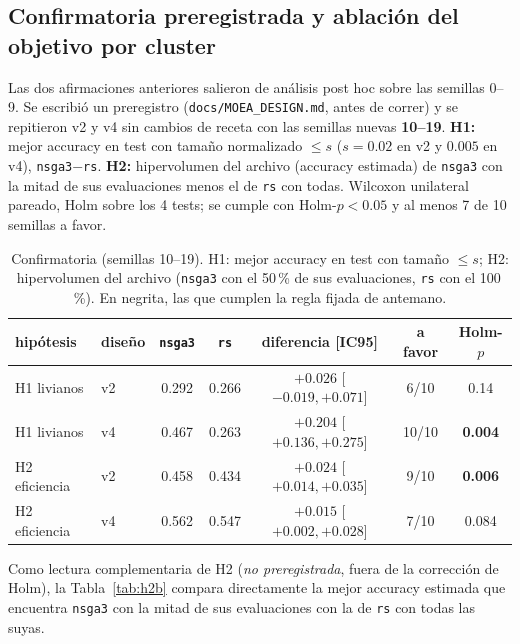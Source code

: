 \documentclass[11pt,a4paper]{article}
\begin{document}
\subsection*{Confirmatoria preregistrada y ablación del objetivo por cluster}
Las dos afirmaciones anteriores salieron de análisis post hoc sobre las semillas 0--9. Se escribió un preregistro (\texttt{docs/MOEA\_DESIGN.md}, antes de correr) y se repitieron v2 y v4 sin cambios de receta con las semillas nuevas \textbf{10--19}. \textbf{H1:} mejor accuracy en test con tamaño normalizado $\le s$ ($s=0.02$ en v2 y $0.005$ en v4), \texttt{nsga3}$-$\texttt{rs}. \textbf{H2:} hipervolumen del archivo (accuracy estimada) de \texttt{nsga3} con la mitad de sus evaluaciones menos el de \texttt{rs} con todas. Wilcoxon unilateral pareado, Holm sobre los 4 tests; se cumple con Holm-$p<0.05$ y al menos 7 de 10 semillas a favor.
\begin{table}[h]
\centering\small
\begin{tabular}{llccccc}
\toprule
hipótesis & diseño & \texttt{nsga3} & \texttt{rs} & diferencia [IC95] & a favor & Holm-$p$\\
\midrule
H1 livianos & v2 & 0.292 & 0.266 & $+0.026$ [$-0.019,+0.071$] & 6/10 & 0.14 \\
H1 livianos & v4 & 0.467 & 0.263 & $+0.204$ [$+0.136,+0.275$] & 10/10 & \textbf{0.004}\\
H2 eficiencia & v2 & 0.458 & 0.434 & $+0.024$ [$+0.014,+0.035$] & 9/10 & \textbf{0.006}\\
H2 eficiencia & v4 & 0.562 & 0.547 & $+0.015$ [$+0.002,+0.028$] & 7/10 & 0.084\\
\bottomrule
\end{tabular}
\caption{Confirmatoria (semillas 10--19). H1: mejor accuracy en test con tamaño $\le s$; H2: hipervolumen del archivo (\texttt{nsga3} con el 50\,\% de sus evaluaciones, \texttt{rs} con el 100\,\%). En negrita, las que cumplen la regla fijada de antemano.}
\label{tab:confirm}
\end{table}
Como lectura complementaria de H2 (\emph{no preregistrada}, fuera de la corrección de Holm), la Tabla~\ref{tab:h2b} compara directamente la mejor accuracy estimada que encuentra \texttt{nsga3} con la mitad de sus evaluaciones con la de \texttt{rs} con todas las suyas.
\end{document}
